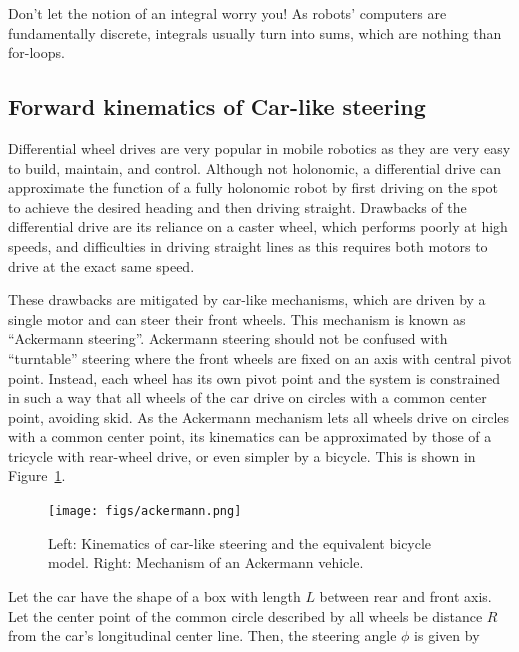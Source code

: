 \begin{framed}
Don't let the notion of an integral worry you! As robots' computers are fundamentally discrete, integrals usually turn into sums, which are nothing than for-loops.
\end{framed}



\subsection{Forward kinematics of Car-like steering}
Differential wheel drives are very popular in mobile robotics as they are very easy to build, maintain, and control. Although not holonomic, a differential drive can approximate the function of a fully holonomic robot by first driving on the spot to achieve the desired heading and then driving straight. Drawbacks of the differential drive are its reliance on a caster wheel, which performs poorly at high speeds, and difficulties in driving straight lines as this requires both motors to drive at the exact same speed.


These drawbacks are mitigated by car-like mechanisms, which are driven by a single motor and can steer their front wheels. This mechanism is known as ``Ackermann steering''.  Ackermann steering should not be confused with ``turntable'' steering  where the front wheels are fixed on an axis with central pivot point. Instead, each wheel has its own pivot point and the system is constrained in such a way that all wheels of the car drive on circles with a common center point, avoiding skid. As the Ackermann mechanism lets all wheels drive on circles with a common center point, its kinematics can be approximated by those of a tricycle with rear-wheel drive, or even simpler by a bicycle. This is shown in Figure~\ref{fig:ackermann}.

\begin{figure}[htb!]
	\centering
		\texttt{[image: figs/ackermann.png]}
	\caption{Left: Kinematics of car-like steering and the equivalent bicycle model. Right: Mechanism of an Ackermann vehicle.}
	\label{fig:ackermann}
\end{figure}

Let the car have the shape of a box with length $L$ between rear and front axis. Let the center point of the common circle described by all wheels be distance $ R$ from the car's longitudinal center line.  Then, the steering angle $ \phi$ is given by

